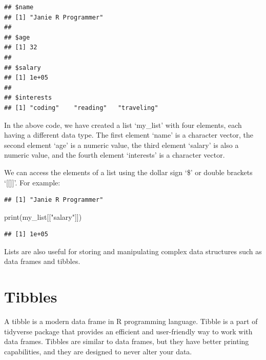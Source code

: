 \documentclass[
]{book}
\newenvironment{Shaded}{\begin{snugshade}}{\end{snugshade}}
\newcommand{\CommentTok}[1]{\textcolor[rgb]{0.56,0.35,0.01}{\textit{#1}}}
\newcommand{\FunctionTok}[1]{\textcolor[rgb]{0.00,0.00,0.00}{#1}}
\newcommand{\NormalTok}[1]{#1}
\newcommand{\SpecialCharTok}[1]{\textcolor[rgb]{0.00,0.00,0.00}{#1}}
\newcommand{\StringTok}[1]{\textcolor[rgb]{0.31,0.60,0.02}{#1}}
\begin{document}
\begin{verbatim}
## $name
## [1] "Janie R Programmer"
## 
## $age
## [1] 32
## 
## $salary
## [1] 1e+05
## 
## $interests
## [1] "coding"    "reading"   "traveling"
\end{verbatim}

In the above code, we have created a list `my\_list' with four elements, each having a different data type. The first element `name' is a character vector, the second element `age' is a numeric value, the third element `salary' is also a numeric value, and the fourth element `interests' is a character vector.

We can access the elements of a list using the dollar sign `\$' or double brackets `{[}{[}{]}{]}'. For example:

\begin{Shaded}
\end{Shaded}

\begin{verbatim}
## [1] "Janie R Programmer"
\end{verbatim}

\begin{Shaded}
\begin{Highlighting}[]
\FunctionTok{print}\NormalTok{(my\_list[[}\StringTok{"salary"}\NormalTok{]])}
\end{Highlighting}
\end{Shaded}

\begin{verbatim}
## [1] 1e+05
\end{verbatim}

Lists are also useful for storing and manipulating complex data structures such as data frames and tibbles.

\hypertarget{tibbles}{%
\section{Tibbles}\label{tibbles}}

A tibble is a modern data frame in R programming language. Tibble is a part of tidyverse package that provides an efficient and user-friendly way to work with data frames. Tibbles are similar to data frames, but they have better printing capabilities, and they are designed to never alter your data.
\end{document}
